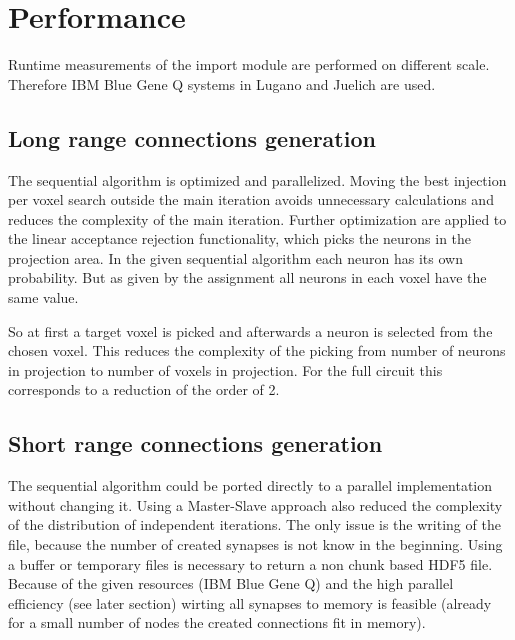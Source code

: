\section{Performance}
Runtime measurements of the import module are performed on different scale.
Therefore IBM Blue Gene Q systems in Lugano and Juelich are used.

\subsection{Long range connections generation}
The sequential algorithm is optimized and parallelized. Moving the best injection per voxel search outside the main iteration
avoids unnecessary calculations and reduces the complexity of the main iteration. Further optimization are applied
to the linear acceptance rejection functionality, which picks the neurons in the projection area.
In the given sequential algorithm each neuron has its own probability.
But as given by the assignment all neurons in each voxel have the same value.

So at first a target voxel is picked and afterwards a neuron is selected from the chosen voxel.
This reduces the complexity of the picking from number of neurons in projection to number of voxels in projection.
For the full circuit this corresponds to a reduction of the order of 2.


\subsection{Short range connections generation}
The sequential algorithm could be ported directly to a parallel implementation without changing it.
Using a Master-Slave approach also reduced the complexity of the distribution of independent iterations.
The only issue is the writing of the file, because the number of created synapses is not know in the beginning.
Using a buffer or temporary files is necessary to return a non chunk based HDF5 file.
Because of the given resources (IBM Blue Gene Q) and the high parallel efficiency (see later section)
wirting all synapses to memory is feasible (already for a small number of nodes the created connections fit in memory).

